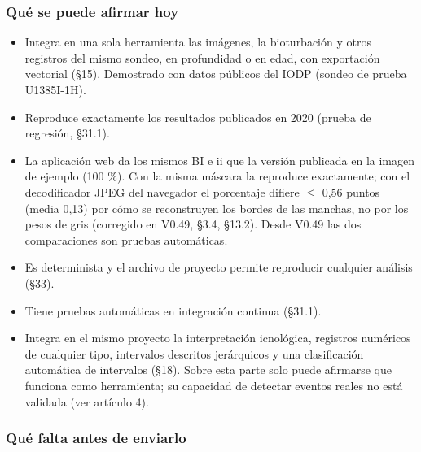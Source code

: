 \documentclass[
  10pt,
]{article}
\providecommand{\tightlist}{%
  \setlength{\itemsep}{0pt}\setlength{\parskip}{0pt}}
\begin{document}
\hypertarget{quuxe9-se-puede-afirmar-hoy}{%
\subsubsection{Qué se puede afirmar
hoy}\label{quuxe9-se-puede-afirmar-hoy}}

\begin{itemize}
\tightlist
\item
  Integra en una sola herramienta las imágenes, la bioturbación y otros
  registros del mismo sondeo, en profundidad o en edad, con exportación
  vectorial (§15). Demostrado con datos públicos del IODP (sondeo de
  prueba U1385I-1H).
\item
  Reproduce exactamente los resultados publicados en 2020 (prueba de
  regresión, §31.1).
\item
  La aplicación web da los mismos BI e ii que la versión publicada en la
  imagen de ejemplo (100 \%). Con la misma máscara la reproduce
  exactamente; con el decodificador JPEG del navegador el porcentaje
  difiere $\leq$ 0,56 puntos (media 0,13) por cómo se reconstruyen los bordes
  de las manchas, no por los pesos de gris (corregido en V0.49, §3.4,
  §13.2). Desde V0.49 las dos comparaciones son pruebas automáticas.
\item
  Es determinista y el archivo de proyecto permite reproducir cualquier
  análisis (§33).
\item
  Tiene pruebas automáticas en integración continua (§31.1).
\item
  Integra en el mismo proyecto la interpretación icnológica, registros
  numéricos de cualquier tipo, intervalos descritos jerárquicos y una
  clasificación automática de intervalos (§18). Sobre esta parte solo
  puede afirmarse que funciona como herramienta; su capacidad de
  detectar eventos reales no está validada (ver artículo 4).
\end{itemize}

\hypertarget{quuxe9-falta-antes-de-enviarlo}{%
\subsubsection{Qué falta antes de
enviarlo}\label{quuxe9-falta-antes-de-enviarlo}}
\end{document}
